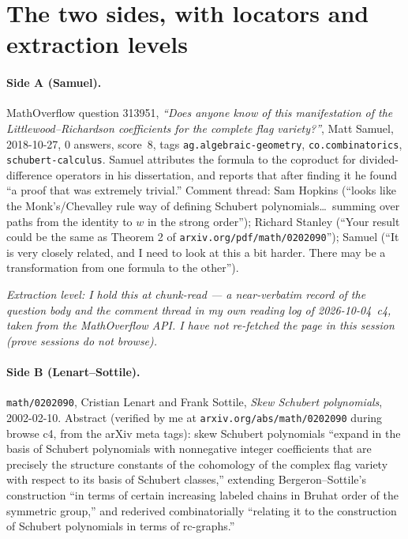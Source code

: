 \documentclass[11pt]{article}
\theoremstyle{plain}
\theoremstyle{definition}
\begin{document}
\section{The two sides, with locators and extraction levels}

\paragraph{Side A (Samuel).} MathOverflow question 313951, \emph{``Does anyone
know of this manifestation of the Littlewood--Richardson coefficients for the
complete flag variety?''}, Matt Samuel, 2018-10-27, $0$ answers, score~$8$,
tags \texttt{ag.algebraic-geometry}, \texttt{co.combinatorics},
\texttt{schubert-calculus}. Samuel attributes the formula to the coproduct for
divided-difference operators in his dissertation, and reports that after
finding it he found ``a proof that was extremely trivial.'' Comment thread:
Sam Hopkins (``looks like the Monk's/Chevalley rule way of defining Schubert
polynomials\dots\ summing over paths from the identity to $w$ in the strong
order''); Richard Stanley (``Your result could be the same as Theorem 2 of
\texttt{arxiv.org/pdf/math/0202090}''); Samuel (``It is very closely related,
and I need to look at this a bit harder. There may be a transformation from
one formula to the other'').

\emph{Extraction level: I hold this at chunk-read --- a near-verbatim record of
the question body and the comment thread in my own reading log of
2026-10-04~c4, taken from the MathOverflow API. I have not re-fetched the page
in this session (prove sessions do not browse).}

\paragraph{Side B (Lenart--Sottile).} \texttt{math/0202090}, Cristian Lenart
and Frank Sottile, \emph{Skew Schubert polynomials}, 2002-02-10. Abstract
(verified by me at \texttt{arxiv.org/abs/math/0202090} during browse c4, from
the arXiv meta tags): skew Schubert polynomials ``expand in the basis of
Schubert polynomials with nonnegative integer coefficients that are precisely
the structure constants of the cohomology of the complex flag variety with
respect to its basis of Schubert classes,'' extending Bergeron--Sottile's
construction ``in terms of certain increasing labeled chains in Bruhat order
of the symmetric group,'' and rederived combinatorially ``relating it to the
construction of Schubert polynomials in terms of rc-graphs.''
\end{document}
